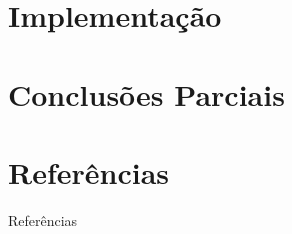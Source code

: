 \documentclass[xcolor=table]{beamer}
\begin{document}
    \section[]{Implementação}
    

    \section[]{Conclusões Parciais}
    
    
    

    \section[]{Referências}
    \begin{frame}[allowframebreaks]{Referências}
        
    \end{frame}
\end{document}
